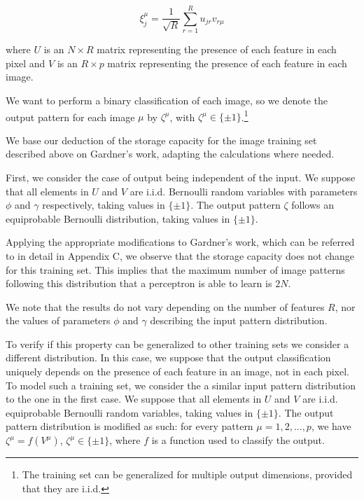 \documentclass[a4paper, 11pt]{article}
\begin{document}
\begin{equation}
    \xi_j^\mu = \frac{1}{\sqrt{R}} \sum_{r=1}^R u_{j r} v_{r \mu}
\end{equation}

\noindent where $U$ is an $N \times R$ matrix representing the presence of each feature in each pixel and $V$ is an $R \times p$ matrix representing the presence of each feature in each image.

We want to perform a binary classification of each image, so we denote the output pattern for each image $\mu$ by $\zeta^\mu$, with $\zeta^\mu \in \{ \pm 1 \}$.\footnote{The training set can be generalized for multiple output dimensions, provided that they are i.i.d.}

We base our deduction of the storage capacity for the image training set described above on Gardner's work, adapting the calculations where needed.

First, we consider the case of output being independent of the input. We suppose that all elements in $U$ and $V$ are i.i.d. Bernoulli random variables with parameters $\phi$ and  $\gamma$ respectively, taking values in $\{ \pm 1 \}$. The output pattern $\zeta$ follows an equiprobable Bernoulli distribution, taking values in $\{ \pm 1 \}$.

Applying the appropriate modifications to Gardner's work, which can be referred to in detail in Appendix C, we observe that the storage capacity does not change for this training set. This implies that the maximum number of image patterns following this distribution that a perceptron is able to learn is $2N$.

We note that the results do not vary depending on the number of features $R$, nor the values of parameters $\phi$ and $\gamma$ describing the input pattern distribution.

To verify if this property can be generalized to other training sets we consider a different distribution. In this case, we suppose that the output classification uniquely depends on the presence of each feature in an image, not in each pixel. To model such a training set, we consider the a similar input pattern distribution to the one in the first case. We suppose that all elements in $U$ and $V$ are i.i.d. equiprobable Bernoulli random variables, taking values in $\{ \pm 1 \}$. The output pattern distribution is modified as such: for every pattern $\mu = 1, 2, ..., p$, we have $\zeta^\mu = f(V^\mu)$, $\zeta^\mu \in \{ \pm 1 \}$, where $f$ is a function used to classify the output.
\end{document}
